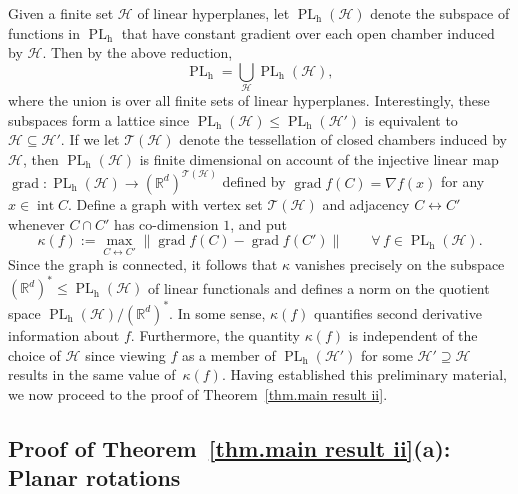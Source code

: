 \documentclass{article}
\theoremstyle{plain}
\theoremstyle{definition}
\begin{document}
Given a finite set $\mathcal{H}$ of linear hyperplanes, let $\operatorname{PL}_{\operatorname{h}}(\mathcal{H})$ denote the subspace of functions in $\operatorname{PL}_{\operatorname{h}}$ that have constant gradient over each open chamber induced by $\mathcal{H}$.
Then by the above reduction,
\begin{equation}
\label{eq.stratification of PL}
\operatorname{PL}_{\operatorname{h}}
=\bigcup_\mathcal{H}\operatorname{PL}_{\operatorname{h}}(\mathcal{H}),
\end{equation}
where the union is over all finite sets of linear hyperplanes.
Interestingly, these subspaces form a lattice since $\operatorname{PL}_{\operatorname{h}}(\mathcal{H})\leq\operatorname{PL}_{\operatorname{h}}(\mathcal{H}')$ is equivalent to $\mathcal{H}\subseteq\mathcal{H}'$.
If we let $\mathcal{T}(\mathcal{H})$ denote the tessellation of closed chambers induced by $\mathcal{H}$, then $\operatorname{PL}_{\operatorname{h}}(\mathcal{H})$ is finite dimensional on account of the injective linear map $\operatorname{grad}\colon\operatorname{PL}_{\operatorname{h}}(\mathcal{H})\to(\mathbb{R}^d)^{\mathcal{T}(\mathcal{H})}$ defined by $\operatorname{grad}f(C)=\nabla f(x)$ for any $x\in\operatorname{int}C$.
Define a graph with vertex set $\mathcal{T}(\mathcal{H})$ and adjacency $C\leftrightarrow C'$ whenever $C\cap C'$ has co-dimension $1$, and put
\[
\kappa(f)
:=\max_{C\leftrightarrow C'}\|\operatorname{grad}f(C)-\operatorname{grad}f(C')\|
\qquad
\forall \, f \in \operatorname{PL}_{\operatorname{h}}(\mathcal{H}).
\]
Since the graph is connected, it follows that $\kappa$ vanishes precisely on the subspace $(\mathbb{R}^d)^*\leq\operatorname{PL}_{\operatorname{h}}(\mathcal{H})$ of linear functionals and defines a norm on the quotient space $\operatorname{PL}_{\operatorname{h}}(\mathcal{H})/(\mathbb{R}^d)^*$.
In some sense, $\kappa(f)$ quantifies second derivative information about $f$.
Furthermore, the quantity $\kappa(f)$ is independent of the choice of $\mathcal{H}$ since viewing $f$ as a member of $\operatorname{PL}_{\operatorname{h}}(\mathcal{H}')$ for some $\mathcal{H}'\supseteq\mathcal{H}$ results in the same value of~$\kappa(f)$.
Having established this preliminary material, we now proceed to the proof of Theorem~\ref{thm.main result ii}.

\subsection{Proof of Theorem~\ref{thm.main result ii}(a): Planar rotations}
\end{document}
